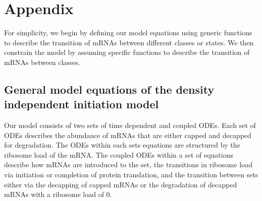\documentclass[review]{elsarticle}
\newcommand{\imax}{\ensuremath{{i_{\max}}}\xspace}
\begin{document}
%


 


\section{Appendix}

For simplicity, we begin by defining our model equations using generic functions to describe the transition of mRNAs between different classes or states.
We then constrain the model by assuming specific functions to describe the transition of mRNAs between classes.

\subsection*{General model equations of the density independent initiation model}
Our model consists of two sets of time dependent and coupled ODEs.
Each set of ODEs describes the abundance of mRNAs that are either capped and decapped for degradation.
The ODEs within each sets equations are structured by the ribosome load of the mRNA.
The coupled ODEs within a set of equations describe how mRNAs are introduced to the set, the transitions in ribosome load via initiation or completion of protein translation,  and the transition between sets either via the decapping of capped mRNAs or the degradation of decapped mRNAs with a ribosome load of 0.
\end{document}

